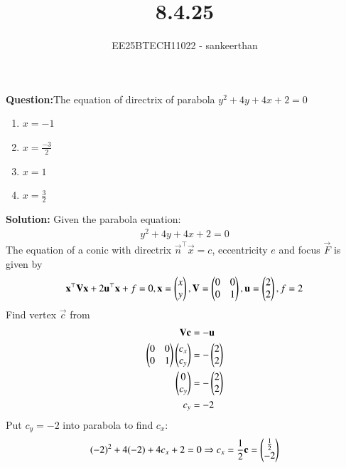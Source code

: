 \documentclass[journal]{IEEEtran}
\begin{document}


\title{8.4.25}
\author{EE25BTECH11022 - sankeerthan}
{\let\newpage\relax\maketitle}

\renewcommand{\thefigure}{\theenumi}
\renewcommand{\thetable}{\theenumi}
\setlength{\intextsep}{10pt} %


\renewcommand{\thetable}{\theenumi}

\textbf{Question:}The equation of directrix of parabola $y^2+4y+4x+2=0$
\begin{enumerate}
     \item $x=-1$
     \item $x=\frac{-3}{2}$
     \item $x=1$
     \item $x=\frac{3}{2}$
\end{enumerate}

\textbf{Solution:}
Given the parabola equation:
\begin{align}
y^2 + 4y + 4x + 2 = 0
\end{align}
The equation of a conic with directrix $\vec{n}^\top \vec{x} = c$, eccentricity $e$ and focus $\vec{F}$ is given by
\begin{align}
\mathbf{x}^\top\mathbf{V}\mathbf{x} + 2\mathbf{u}^\top\mathbf{x} + f = 0,\mathbf{x} = \begin{pmatrix}x \\ y\end{pmatrix},
\mathbf{V} =\begin{pmatrix}0 & 0 \\0 & 1\end{pmatrix},\mathbf{u} =\begin{pmatrix}2 \\ 2\end{pmatrix},f = 2
\end{align}
Find vertex $\vec{c}$ from
\begin{align}
\mathbf{V} \mathbf{c} &= -\mathbf{u}  \\
\begin{pmatrix}0 & 0 \\0 & 1\end{pmatrix}\begin{pmatrix}c_x \\c_y\end{pmatrix} &=-\begin{pmatrix}2 \\ 2\end{pmatrix} \\
\begin{pmatrix}0 \\c_y\end{pmatrix} &=-\begin{pmatrix}2 \\ 2\end{pmatrix} \\
c_y &= -2
\end{align}
Put $c_y=-2$ into parabola to find  $c_x$:
\begin{align}
(-2)^2 + 4(-2) + 4 c_x + 2 = 0  \Rightarrow  c_x = \frac{1}{2}
\mathbf{c} = \begin{pmatrix} \frac{1}{2} \\ -2 \end{pmatrix}
\end{align}
\end{document}
